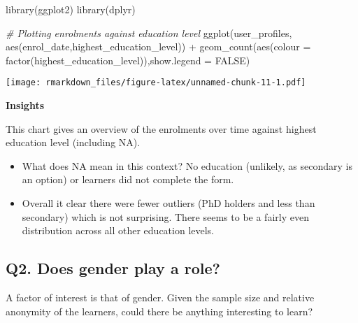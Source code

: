\documentclass[
]{article}
\newenvironment{Shaded}{\begin{snugshade}}{\end{snugshade}}
\newcommand{\AttributeTok}[1]{\textcolor[rgb]{0.77,0.63,0.00}{#1}}
\newcommand{\CommentTok}[1]{\textcolor[rgb]{0.56,0.35,0.01}{\textit{#1}}}
\newcommand{\ConstantTok}[1]{\textcolor[rgb]{0.00,0.00,0.00}{#1}}
\newcommand{\FunctionTok}[1]{\textcolor[rgb]{0.00,0.00,0.00}{#1}}
\newcommand{\NormalTok}[1]{#1}
\newcommand{\OtherTok}[1]{\textcolor[rgb]{0.56,0.35,0.01}{#1}}
\newcommand{\SpecialCharTok}[1]{\textcolor[rgb]{0.00,0.00,0.00}{#1}}
\begin{document}
\begin{Shaded}
\begin{Highlighting}[]
\FunctionTok{library}\NormalTok{(ggplot2)}
\FunctionTok{library}\NormalTok{(dplyr)}

\CommentTok{\# Plotting enrolments against education level}
\FunctionTok{ggplot}\NormalTok{(user\_profiles, }\FunctionTok{aes}\NormalTok{(enrol\_date,highest\_education\_level)) }\SpecialCharTok{+} \FunctionTok{geom\_count}\NormalTok{(}\FunctionTok{aes}\NormalTok{(}\AttributeTok{colour =} \FunctionTok{factor}\NormalTok{(highest\_education\_level)),}\AttributeTok{show.legend =} \ConstantTok{FALSE}\NormalTok{)}
\end{Highlighting}
\end{Shaded}

\texttt{[image: rmarkdown\_files/figure-latex/unnamed-chunk-11-1.pdf]}

\textbf{Insights}

This chart gives an overview of the enrolments over time against highest
education level (including NA).

\begin{itemize}
\item
  What does NA mean in this context? No education (unlikely, as
  secondary is an option) or learners did not complete the form.
\item
  Overall it clear there were fewer outliers (PhD holders and less than
  secondary) which is not surprising. There seems to be a fairly even
  distribution across all other education levels.
\end{itemize}

\newpage

\hypertarget{q2.-does-gender-play-a-role}{%
\subsection{Q2. Does gender play a
role?}\label{q2.-does-gender-play-a-role}}

A factor of interest is that of gender. Given the sample size and
relative anonymity of the learners, could there be anything interesting
to learn?

\begin{Shaded}
\end{Shaded}
\end{document}
